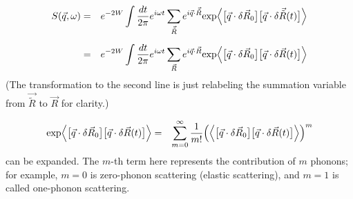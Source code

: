 \documentclass[a4j]{jsarticle}
\begin{document}
\begin{eqnarray}
	S(\vec{q},\omega)
	&=&
	e^{-2W}
	\int \dfrac{ dt }{ 2 \pi }
	e^{ i \omega t }
	\sum_{ \vec{\tilde{R}} }
	e^{ i \vec{q} \cdot \vec{\tilde{R}} }
		{\rm exp}
	\Big\langle \big[ \vec{q} \cdot \delta \vec{R}_{0} \big] \big[ \vec{q} \cdot \delta \vec{\tilde{R}}(t) \big] \Big\rangle
	\nonumber \\[2mm] &=&
	e^{-2W}
	\int \dfrac{ dt }{ 2 \pi }
	e^{ i \omega t }
	\sum_{ \vec{R} }
	e^{ i \vec{q} \cdot \vec{R} }
		{\rm exp}
	\Big\langle \big[ \vec{q} \cdot \delta \vec{R}_{0} \big] \big[ \vec{q} \cdot \delta \vec{R}(t) \big] \Big\rangle
\end{eqnarray}
(The transformation to the second line is just relabeling the summation variable from $\vec{\tilde{R}}$ to $\vec{R}$ for clarity.)

\begin{eqnarray}
	{\rm exp}
	\Big\langle \big[ \vec{q} \cdot \delta \vec{R}_{0} \big] \big[ \vec{q} \cdot \delta \vec{R}(t) \big] \Big\rangle
	&=&
	\sum_{m=0}^{\infty}
	\dfrac{1}{m!}
	\Big( \Big\langle \big[ \vec{q} \cdot \delta \vec{R}_{0} \big] \big[ \vec{q} \cdot \delta \vec{R}(t) \big] \Big\rangle \Big)^{m}
\end{eqnarray}
can be expanded. The $m$-th term here represents the contribution of $m$ phonons; for example, $m=0$ is zero-phonon scattering (elastic scattering), and $m=1$ is called one-phonon scattering.
\end{document}
